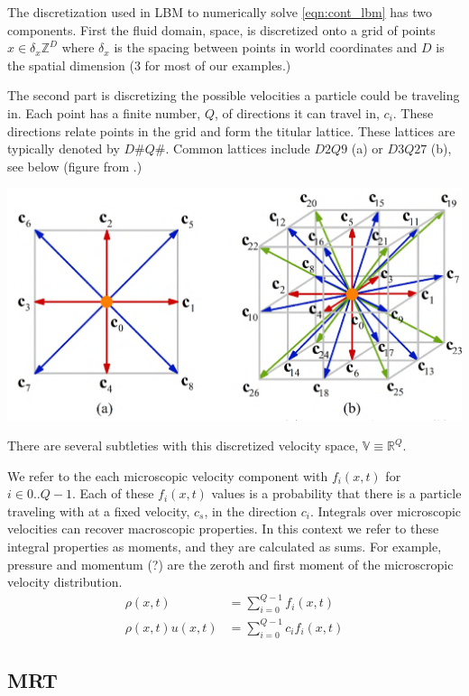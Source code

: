 The discretization used in LBM to numerically solve \ref{eqn:cont_lbm} 
has two components.
First the fluid domain, space, is 
discretized onto a
grid of points $x \in \delta_x \mathbb{Z}^D$
where $\delta_x$ is the spacing between points in world coordinates
and $D$ is the spatial dimension ($3$ for most of our examples.)

The second part is discretizing the possible velocities a particle 
could be traveling in. 
Each point has a finite number, $Q$, of directions it can travel in, $c_i$.
These directions relate points in the grid and form the titular lattice.
These lattices are typically denoted by $D\#Q\#$.
Common lattices include $D2Q9$ (a) or $D3Q27$ (b), see below (figure from \cite{Li2020}.)
\begin{center}
\includegraphics[width=0.6\linewidth]{lattice_figure.png}
\end{center}

There are several subtleties with this discretized velocity space, 
$\mathbb{V} \equiv \mathbb{R}^Q$. 
\begin{outline}
\1 We refer to the each microscopic velocity component with 
$f_i(x, t)$ for $i \in 0..Q - 1$.
\1 Each of these $f_i(x, t)$ values is a probability that there is a particle traveling with at a fixed velocity, $c_s$, in the direction $c_i$.
\1 Integrals over microscopic velocities can recover macroscopic properties.
In this context we refer to these integral properties as moments, 
and they are calculated as sums. 
For example, pressure and momentum (?) are the zeroth and first moment 
of the microscropic velocity distribution.
\begin{align}
  \rho(x, t) &= \sum_{i = 0}^{Q - 1} f_i(x, t) \\
  \rho(x,t)u(x,t) &= \sum_{i = 0}^{Q - 1}c_i f_i(x, t)
\end{align}
\end{outline}

\subsection{MRT}

